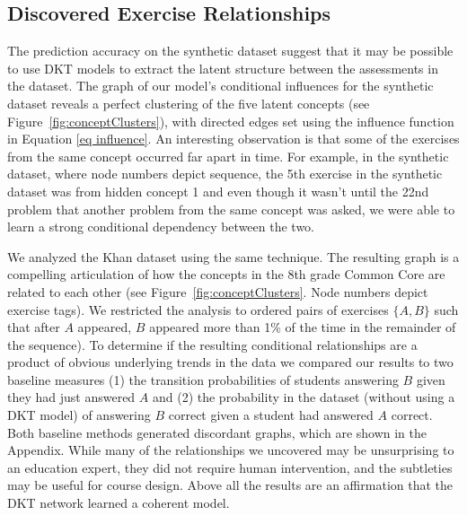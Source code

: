 \subsection{Discovered Exercise Relationships}\label{sec ex rel}

The prediction accuracy on the synthetic dataset suggest that it may be possible to use DKT models to extract the latent structure between the assessments in the dataset. The graph of our model's conditional influences for the synthetic dataset reveals a perfect clustering of the five latent concepts (see Figure~\ref{fig:conceptClusters}),
with directed edges set using the influence function in Equation \ref{eq influence}.
An interesting observation is that some of the exercises from the same concept occurred far apart in time. For example, in the synthetic dataset, where node numbers depict sequence, the 5th exercise in the synthetic dataset was from hidden concept 1 and even though it wasn't until the 22nd problem that another problem from the same concept was asked, we were able to learn a strong conditional dependency between the two.

We analyzed the Khan dataset using the same technique. The resulting graph is a compelling articulation of how the concepts in the 8th grade Common Core are related to each other (see Figure~\ref{fig:conceptClusters}. Node numbers depict exercise tags).
We restricted the analysis to ordered pairs of exercises $\{A,B\}$ such that after $A$ appeared, $B$ appeared more than 1\% of the time in the remainder of the sequence).
To determine if the resulting conditional relationships are a product of obvious underlying trends in the data we compared our results to two baseline measures (1) the transition probabilities of students answering $B$ given they had just answered $A$ and (2) the probability in the dataset (without using a DKT model) of answering $B$ correct given a student had answered $A$ correct.
Both baseline methods generated discordant graphs, which are shown in the Appendix. While many of the relationships we uncovered may be unsurprising to an education expert, they did not require human intervention, and the subtleties may be useful for course design. Above all the results are an affirmation that the DKT network learned a coherent model.


